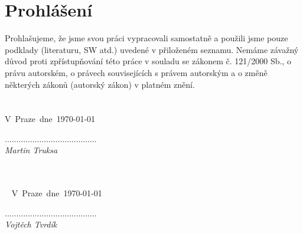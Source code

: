 \null
\vfill %
\section*{Prohlášení}
Prohlašujeme, že jsme svou práci vypracovali samostatně a použili jsme pouze podklady (literaturu, SW atd.) uvedené v přiloženém seznamu. Nemáme závažný důvod proti zpřístupňování této práce v souladu se zákonem č. 121/2000 Sb., o právu autorském, o právech souvisejících s právem autorským a o změně některých zákonů (autorský zákon) v platném znění.\\\\\\

\noindent
V~Praze~dne~\today
\begin{flushright}
........................................\\
\emph{Martin Truksa~~~~~~~~} %
\end{flushright}
~\\~\\~
\noindent
V~Praze~dne~\today
\begin{flushright}
........................................\\
\emph{Vojtěch Tvrdík~~~~~~~~} %
\end{flushright}

\thispagestyle{empty} 
\newpage